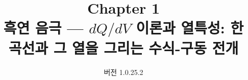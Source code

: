 
\renewcommand{\theequation}{1.\arabic{equation}}
\renewcommand{\thesection}{1.\arabic{section}}

\title{\textbf{\LARGE Chapter 1}\\[0.35em]\Large 흑연 음극 --- $dQ/dV$ 이론과 열특성: 한 곡선과 그 열을 그리는 수식-구동 전개}
\author{}
\date{\normalsize 버전 1.0.25.2}


\maketitle

































